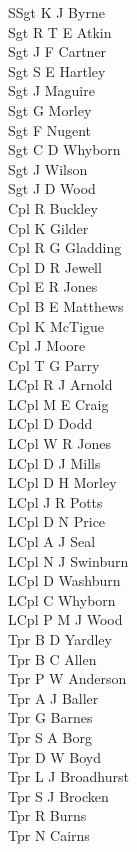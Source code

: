 \begin{multicols}{2}
  \noindent
  SSgt K J Byrne \\
  Sgt R T E Atkin \\
  Sgt J F Cartner \\
  Sgt S E Hartley \\
  Sgt J Maguire \\
  Sgt G Morley \\
  Sgt F Nugent \\
  Sgt C D Whyborn \\
  Sgt J Wilson \\
  Sgt J D Wood \\
  Cpl R Buckley \\
  Cpl K Gilder \\
  Cpl R G Gladding \\
  Cpl D R Jewell \\
  Cpl E R Jones \\
  Cpl B E Matthews \\
  Cpl K McTigue \\
  Cpl J Moore \\
  Cpl T G Parry \\
  LCpl R J Arnold \\
  LCpl M E Craig \\
  LCpl D Dodd \\
  LCpl W R Jones \\
  LCpl D J Mills \\
  LCpl D H Morley \\
  LCpl J R Potts \\
  LCpl D N Price \\
  LCpl A J Seal \\
  LCpl N J Swinburn \\
  LCpl D Washburn \\
  LCpl C Whyborn \\
  LCpl P M J Wood \\
  Tpr B D Yardley \\
  Tpr B C Allen \\
  Tpr P W Anderson \\
  Tpr A J Baller \\
  Tpr G Barnes \\
  Tpr S A Borg \\
  Tpr D W Boyd \\
  Tpr L J Broadhurst \\
  Tpr S J Brocken \\
  Tpr R Burns \\
  Tpr N Cairns \\

\end{multicols}
